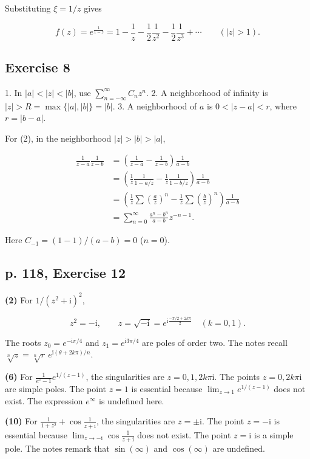 \documentclass[11pt,a4paper]{article}
\theoremstyle{definition}
\theoremstyle{plain}
\begin{document}
Substituting $\xi=1/z$ gives

\[
f(z)=e^{\frac1{1-z}}=1-\frac1z-\frac12\frac1{z^2}-\frac12\frac1{z^3}+\cdots
\qquad (|z|>1).
\]


\subsection{Exercise 8}

1. In $|a|<|z|<|b|$, use $\sum_{n=-\infty}^{\infty}C_nz^n$.
2. A neighborhood of infinity is $|z|>R=\max\{|a|,|b|\}=|b|$.
3. A neighborhood of $a$ is $0<|z-a|<r$, where $r=|b-a|$.

For (2), in the neighborhood $|z|>|b|>|a|$,

\[
\begin{aligned}
\frac1{z-a}\frac1{z-b}
&=\left(\frac1{z-a}-\frac1{z-b}\right)\frac1{a-b}\\
&=\left(\frac1z\frac1{1-a/z}-\frac1z\frac1{1-b/z}\right)\frac1{a-b}\\
&=\left(\frac1z\sum\left(\frac az\right)^n-\frac1z\sum\left(\frac bz\right)^n\right)\frac1{a-b}\\
&=\sum_{n=0}^\infty\frac{a^n-b^n}{a-b}z^{-n-1}.
\end{aligned}
\]

Here $C_{-1}=(1-1)/(a-b)=0$ ($n=0$).


\subsection{p. 118, Exercise 12}

\textbf{(2)} For $1/(z^2+\mathrm{i})^2$,

\[
z^2=-\mathrm{i},\qquad z=\sqrt{-\mathrm{i}}=e^{\mathrm{i}\frac{-\pi/2+2k\pi}{2}}\quad(k=0,1).
\]

The roots $z_0=e^{-\mathrm{i}\pi/4}$ and $z_1=e^{\mathrm{i}3\pi/4}$ are poles of order two. The notes recall $\sqrt[n]{z}=\sqrt[n]{r}\,e^{\mathrm{i}(\theta+2k\pi)/n}$.

\textbf{(6)} For $\frac1{e^z-1}e^{1/(z-1)}$, the singularities are $z=0,1,2k\pi \mathrm{i}$. The points $z=0,2k\pi \mathrm{i}$ are simple poles. The point $z=1$ is essential because $\lim_{z\to1}e^{1/(z-1)}$ does not exist. The expression $e^\infty$ is undefined here.

\textbf{(10)} For $\frac1{1+z^2}+\cos\frac1{z+\mathrm{i}}$, the singularities are $z=\pm \mathrm{i}$. The point $z=-\mathrm{i}$ is essential because $\lim_{z\to-\mathrm{i}}\cos\frac1{z+\mathrm{i}}$ does not exist. The point $z=\mathrm{i}$ is a simple pole. The notes remark that $\sin(\infty)$ and $\cos(\infty)$ are undefined.
\end{document}
